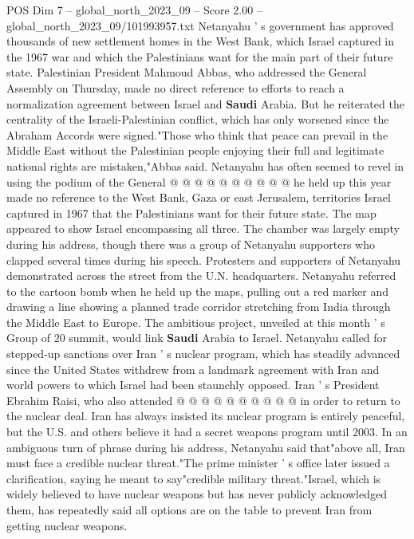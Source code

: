 \begin{textsample}{POS Dim 7 – global\_north\_2023\_09 – Score 2.00 – global\_north\_2023\_09/101993957.txt}
Netanyahu ' s government has approved thousands of new settlement homes in the West Bank, which Israel captured in the 1967 war and which the Palestinians want for the main part of their future state.
Palestinian President Mahmoud Abbas, who addressed the General Assembly on Thursday, made no direct reference to efforts to reach a normalization agreement between Israel and \textbf{Saudi} Arabia.
But he reiterated the centrality of the Israeli-Palestinian conflict, which has only worsened since the Abraham Accords were signed."Those who think that peace can prevail in the Middle East without the Palestinian people enjoying their full and legitimate national rights are mistaken,"Abbas said.
Netanyahu has often seemed to revel in using the podium of the General @ @ @ @ @ @ @ @ @ @ he held up this year made no reference to the West Bank, Gaza or east Jerusalem, territories Israel captured in 1967 that the Palestinians want for their future state.
The map appeared to show Israel encompassing all three.
The chamber was largely empty during his address, though there was a group of Netanyahu supporters who clapped several times during his speech.
Protesters and supporters of Netanyahu demonstrated across the street from the U.N. headquarters.
Netanyahu referred to the cartoon bomb when he held up the maps, pulling out a red marker and drawing a line showing a planned trade corridor stretching from India through the Middle East to Europe.
The ambitious project, unveiled at this month ' s Group of 20 summit, would link \textbf{Saudi} Arabia to Israel.
Netanyahu called for stepped-up sanctions over Iran ' s nuclear program, which has steadily advanced since the United States withdrew from a landmark agreement with Iran and world powers to which Israel had been staunchly opposed.
Iran ' s President Ebrahim Raisi, who also attended @ @ @ @ @ @ @ @ @ @ in order to return to the nuclear deal.
Iran has always insisted its nuclear program is entirely peaceful, but the U.S. and others believe it had a secret weapons program until 2003.
In an ambiguous turn of phrase during his address, Netanyahu said that"above all, Iran must face a credible nuclear threat."The prime minister ' s office later issued a clarification, saying he meant to say"credible military threat."Israel, which is widely believed to have nuclear weapons but has never publicly acknowledged them, has repeatedly said all options are on the table to prevent Iran from getting nuclear weapons.

\end{textsample}
